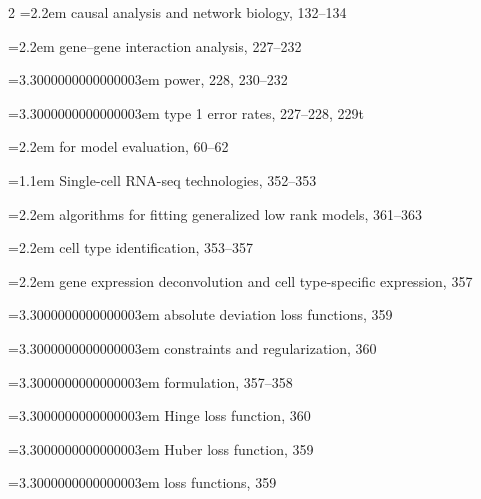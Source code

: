 \begin{multicols}{2}
\noindent\hangindent=2.2em \hspace*{1.1em}causal analysis and network biology, 132--134\par
\noindent\hangindent=2.2em \hspace*{1.1em}gene--gene interaction analysis, 227--232\par
\noindent\hangindent=3.3000000000000003em \hspace*{2.2em}power, 228, 230--232\par
\noindent\hangindent=3.3000000000000003em \hspace*{2.2em}type 1 error rates, 227--228, 229t\par
\noindent\hangindent=2.2em \hspace*{1.1em}for model evaluation, 60--62\par
\noindent\hangindent=1.1em Single-cell RNA-seq technologies, 352--353\par
\noindent\hangindent=2.2em \hspace*{1.1em}algorithms for fitting generalized low rank models, 361--363\par
\noindent\hangindent=2.2em \hspace*{1.1em}cell type identification, 353--357\par
\noindent\hangindent=2.2em \hspace*{1.1em}gene expression deconvolution and cell type-specific expression, 357\par
\noindent\hangindent=3.3000000000000003em \hspace*{2.2em}absolute deviation loss functions, 359\par
\noindent\hangindent=3.3000000000000003em \hspace*{2.2em}constraints and regularization, 360\par
\noindent\hangindent=3.3000000000000003em \hspace*{2.2em}formulation, 357--358\par
\noindent\hangindent=3.3000000000000003em \hspace*{2.2em}Hinge loss function, 360\par
\noindent\hangindent=3.3000000000000003em \hspace*{2.2em}Huber loss function, 359\par
\noindent\hangindent=3.3000000000000003em \hspace*{2.2em}loss functions, 359\par

\end{multicols}
